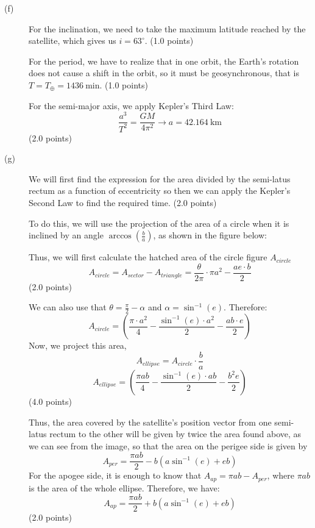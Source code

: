 \begin{description}
\item[(f)] For the inclination, we need to take the maximum latitude reached
  by the satellite, which gives us $\boxed{i = 63^\circ}$.
  \hfill(1.0 points)

  For the period, we have to realize that in one orbit, the Earth's rotation
  does not cause a shift in the orbit, so it must be geosynchronous, that is
  $T = T_\oplus = \boxed{1436\ \mathrm{min}}$. \hfill(1.0 points)

  For the semi-major axis, we apply Kepler's Third Law:
  \[
    \frac{a^3}{T^2} = \frac{GM}{4\pi^2}
    \rightarrow \boxed{a = 42.164\ \mathrm{km}}
  \]
  \hfill(2.0 points)

\item[(g)] We will first find the expression for the area divided by the
  semi-latus rectum as a function of eccentricity so then we can apply the
  Kepler's Second Law to find the required time. \hfill(2.0 points)

  To do this, we will use the projection of the area of a circle when it is
  inclined by an angle $\arccos\left(\frac{b}{a}\right)$, as shown in the
  figure below:


  Thus, we will first calculate the hatched area of the circle figure
  $A_{circle}$
  \[
    A_{circle} = A_{sector} - A_{triangle}
      = \frac{\theta}{2\pi}\cdot\pi a^2 - \frac{ae\cdot b}{2}
  \]
  \hfill(2.0 points)

  We can also use that $\theta = \frac{\pi}{2} - \alpha$ and
  $\alpha = \sin^{-1}(e)$. Therefore:
  \[
    A_{circle} = \left(\frac{\pi\cdot a^2}{4}
      - \frac{\sin^{-1}(e)\cdot a^2}{2} - \frac{ab\cdot e}{2}\right)
  \]
  Now, we project this area,
  \[
    A_{ellipse} = A_{circle}\cdot\frac{b}{a}
  \]
  \[
    A_{ellipse} = \left(\frac{\pi ab}{4}
      - \frac{\sin^{-1}(e)\cdot ab}{2} - \frac{b^2 e}{2}\right)
  \]
  \hfill(4.0 points)

  Thus, the area covered by the satellite's position vector from one
  semi-latus rectum to the other will be given by twice the area found above,
  as we can see from the image, so that the area on the perigee side is given
  by
  \[
    A_{per} = \frac{\pi ab}{2} - b(a\sin^{-1}(e) + eb)
  \]
  For the apogee side, it is enough to know that
  $A_{ap} = \pi ab - A_{per}$, where $\pi ab$ is the area of the whole
  ellipse. Therefore, we have:
  \[
    A_{ap} = \frac{\pi ab}{2} + b\left(a\sin^{-1}(e) + eb\right)
  \]
  \hfill(2.0 points)


\end{description}
